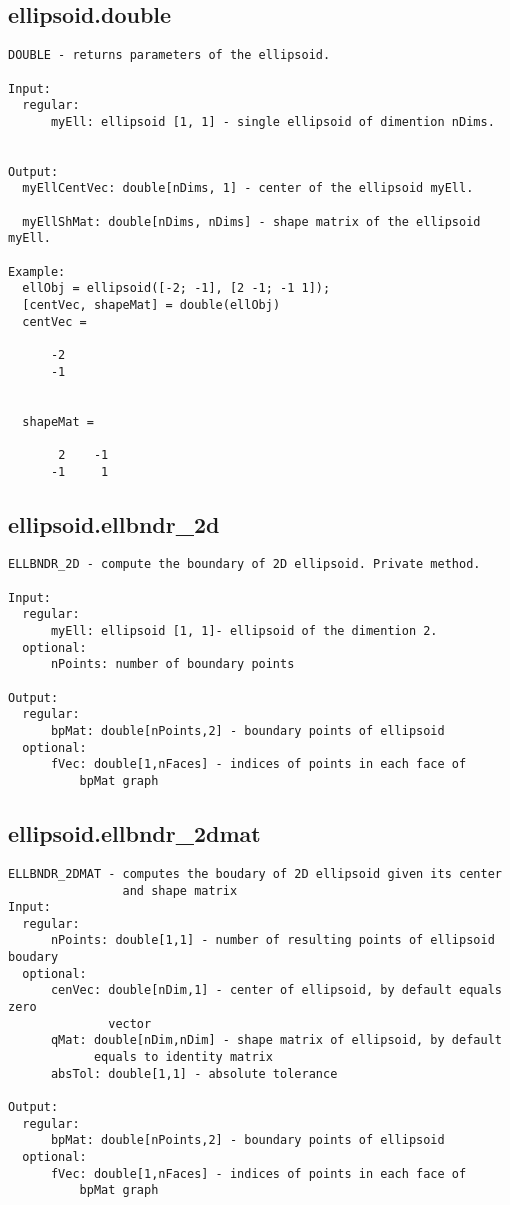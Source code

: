 \subsection{\texorpdfstring{ellipsoid.double}{double}}\label{method:ellipsoid.double}
\begin{verbatim}
DOUBLE - returns parameters of the ellipsoid.

Input:
  regular:
      myEll: ellipsoid [1, 1] - single ellipsoid of dimention nDims.


Output:
  myEllCentVec: double[nDims, 1] - center of the ellipsoid myEll.

  myEllShMat: double[nDims, nDims] - shape matrix of the ellipsoid myEll.

Example:
  ellObj = ellipsoid([-2; -1], [2 -1; -1 1]);
  [centVec, shapeMat] = double(ellObj)
  centVec =

      -2
      -1


  shapeMat =

       2    -1
      -1     1
\end{verbatim}
\subsection{\texorpdfstring{ellipsoid.ellbndr\_2d}{ellbndr\_2d}}\label{method:ellipsoid.ellbndr2d}
\begin{verbatim}
ELLBNDR_2D - compute the boundary of 2D ellipsoid. Private method.

Input:
  regular:
      myEll: ellipsoid [1, 1]- ellipsoid of the dimention 2.
  optional:
      nPoints: number of boundary points

Output:
  regular:
      bpMat: double[nPoints,2] - boundary points of ellipsoid
  optional:
      fVec: double[1,nFaces] - indices of points in each face of
          bpMat graph
\end{verbatim}
\subsection{\texorpdfstring{ellipsoid.ellbndr\_2dmat}{ellbndr\_2dmat}}\label{method:ellipsoid.ellbndr2dmat}
\begin{verbatim}
ELLBNDR_2DMAT - computes the boudary of 2D ellipsoid given its center
                and shape matrix
Input:
  regular:
      nPoints: double[1,1] - number of resulting points of ellipsoid boudary
  optional:
      cenVec: double[nDim,1] - center of ellipsoid, by default equals zero
              vector
      qMat: double[nDim,nDim] - shape matrix of ellipsoid, by default
            equals to identity matrix
      absTol: double[1,1] - absolute tolerance

Output:
  regular:
      bpMat: double[nPoints,2] - boundary points of ellipsoid
  optional:
      fVec: double[1,nFaces] - indices of points in each face of
          bpMat graph
\end{verbatim}
